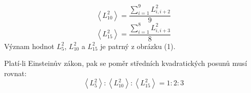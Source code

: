 \documentclass[a4paper,11pt]{article}
\begin{document}
\begin{minipage}[t]{0.5\textwidth}
\begin{equation}
            \left\langle L_{10}^2\right\rangle = \frac{\sum_{i=1}^{9} L_{i,i+2}^2}{9}
        \end{equation}
        \begin{equation}
            \left\langle L_{15}^2\right\rangle = \frac{\sum_{i=1}^{8} L_{i,i+3}^2}{8}
        \end{equation}
        Význam hodnot $L_5^2$, $L_{10}^2$ a $L_{15}^2$ je patrný z obrázku (1).
        \par Platí-li Einsteinův zákon, pak se poměr středních kvadratických posunů musí rovnat:  
        \begin{equation}
            \left\langle L_{5}^2\right\rangle : \left\langle L_{10}^2\right\rangle : \left\langle L_{15}^2\right\rangle = 1 : 2 : 3
        \end{equation}
    \end{minipage}
    \hspace{10pt}
\end{document}
